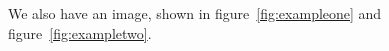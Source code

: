 \documentclass{article}
\begin{document}

We also have an image, shown in figure~\ref{fig:exampleone} and figure~\ref{fig:exampletwo}.


\end{document}

